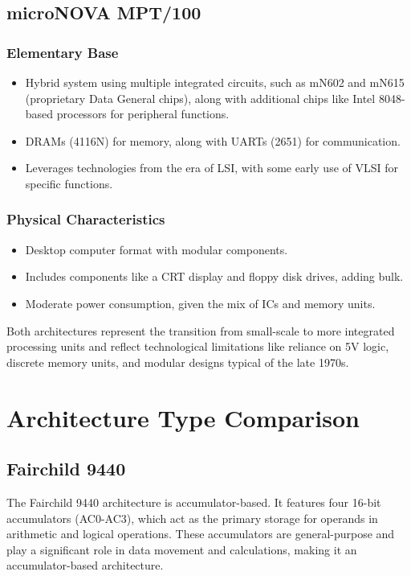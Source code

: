 \documentclass[a4paper,12pt]{article}
\begin{document}
\subsection{microNOVA MPT/100}

\subsubsection{Elementary Base}
\begin{itemize}
    \item Hybrid system using multiple integrated circuits, such as mN602 and mN615 (proprietary Data General chips), along with additional chips like Intel 8048-based processors for peripheral functions.
    \item DRAMs (4116N) for memory, along with UARTs (2651) for communication.
    \item Leverages technologies from the era of LSI, with some early use of VLSI for specific functions.
\end{itemize}

\subsubsection{Physical Characteristics}
\begin{itemize}
    \item Desktop computer format with modular components.
    \item Includes components like a CRT display and floppy disk drives, adding bulk.
    \item Moderate power consumption, given the mix of ICs and memory units.
\end{itemize}

Both architectures represent the transition from small-scale to more integrated processing units and reflect technological limitations like reliance on 5V logic, discrete memory units, and modular designs typical of the late 1970s.

\section{Architecture Type Comparison}

\subsection{Fairchild 9440}
The Fairchild 9440 architecture is accumulator-based. It features four 16-bit accumulators (AC0-AC3), which act as the primary storage for operands in arithmetic and logical operations. These accumulators are general-purpose and play a significant role in data movement and calculations, making it an accumulator-based architecture.
\end{document}
